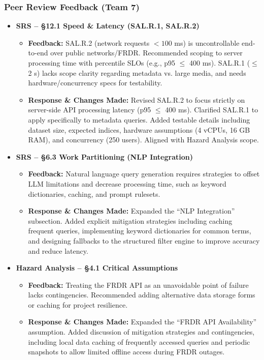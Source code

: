 \documentclass{article}
\begin{document}
\subsubsection*{Peer Review Feedback (Team 7)}

\begin{itemize}
    \item \textbf{SRS -- \S 12.1 Speed \& Latency (SAL.R.1, SAL.R.2)}
    \begin{itemize}
        \item \textbf{Feedback:} SAL.R.2 (network requests $<100$ ms) is uncontrollable end-to-end over public networks/FRDR. Recommended scoping to server processing time with percentile SLOs (e.g., p95 $\le$ 400 ms). SAL.R.1 ($\le$ 2 s) lacks scope clarity regarding metadata vs. large media, and needs hardware/concurrency specs for testability.
        \item \textbf{Response \& Changes Made:} Revised SAL.R.2 to focus strictly on server-side API processing latency (p95 $\le$ 400 ms). Clarified SAL.R.1 to apply specifically to metadata queries. Added testable details including dataset size, expected indices, hardware assumptions (4 vCPUs, 16 GB RAM), and concurrency (250 users). Aligned with Hazard Analysis scope.
    \end{itemize}

    \item \textbf{SRS -- \S 6.3 Work Partitioning (NLP Integration)}
    \begin{itemize}
        \item \textbf{Feedback:} Natural language query generation requires strategies to offset LLM limitations and decrease processing time, such as keyword dictionaries, caching, and prompt rulesets.
        \item \textbf{Response \& Changes Made:} Expanded the ``NLP Integration'' subsection. Added explicit mitigation strategies including caching frequent queries, implementing keyword dictionaries for common terms, and designing fallbacks to the structured filter engine to improve accuracy and reduce latency.
    \end{itemize}

    \item \textbf{Hazard Analysis -- \S 4.1 Critical Assumptions}
    \begin{itemize}
        \item \textbf{Feedback:} Treating the FRDR API as an unavoidable point of failure lacks contingencies. Recommended adding alternative data storage forms or caching for project resilience.
        \item \textbf{Response \& Changes Made:} Expanded the ``FRDR API Availability'' assumption. Added discussion of mitigation strategies and contingencies, including local data caching of frequently accessed queries and periodic snapshots to allow limited offline access during FRDR outages.
    \end{itemize}


\end{itemize}
\end{document}
